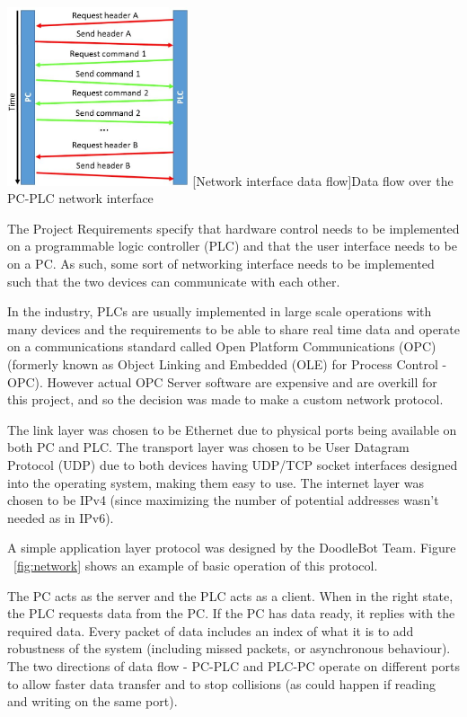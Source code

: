 \begin{center}
	\includegraphics[width=0.4\textwidth]{figures/systemDesign/network.JPG}
	[Network interface data flow]{Data flow over the PC-PLC network interface}
	\label{fig:network}
\end{center}

The Project Requirements specify that hardware control needs to be implemented on a programmable logic controller (PLC) and that the user interface needs to be on a PC. As such, some sort of networking interface needs to be implemented such that the two devices can communicate with each other. 

In the industry, PLCs are usually implemented in large scale operations with many devices and the requirements to be able to share real time data and operate on a communications standard called Open Platform Communications (OPC) (formerly known as Object Linking and Embedded (OLE) for Process Control - OPC). However actual OPC Server software are expensive and are overkill for this project, and so the decision was made to make a custom network protocol.

The link layer was chosen to be Ethernet due to physical ports being available on both PC and PLC. The transport layer was chosen to be User Datagram Protocol (UDP) due to both devices having UDP/TCP socket interfaces designed into the operating system, making them easy to use. The internet layer was chosen to be IPv4 (since maximizing the number of potential addresses wasn't needed as in IPv6).

A simple application layer protocol was designed by the DoodleBot Team. Figure ~\ref{fig:network} shows an example of basic operation of this protocol. 

The PC acts as the server and the PLC acts as a client. When in the right state, the PLC requests data from the PC. If the PC has data ready, it replies with the required data. Every packet of data includes an index of what it is to add robustness of the system (including missed packets, or asynchronous behaviour). The two directions of data flow - PC-PLC and PLC-PC operate on different ports to allow faster data transfer and to stop collisions (as could happen if reading and writing on the same port).

